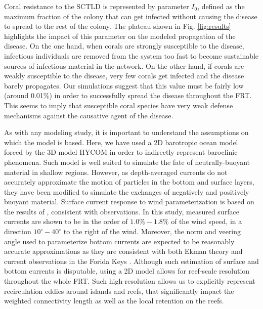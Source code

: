 \documentclass[utf8]{frontiersSCNS}
\begin{document}
Coral resistance to the SCTLD is represented by parameter $I_0$, defined as the maximum fraction of the colony that can get infected without causing the disease to spread to the rest of the colony. The plateau shown in Fig. \ref{fig:results} highlights the impact of this parameter on the modeled propagation of the disease. On the one hand, when corals are strongly susceptible to the disease, infectious individuals are removed from the system too fast to become sustainable sources of infectious material in the network. On the other hand, if corals are weakly susceptible to the disease, very few corals get infected and the disease barely propagates. Our simulations suggest that this value must be fairly low (around 0.01\%) in order to successfully spread the disease throughout the FRT. This seems to imply that susceptible coral species have very weak defense mechanisms against the causative agent of the disease.

As with any modeling study, it is important to understand the assumptions on which the model is based. Here, we have used a 2D barotropic ocean model forced by the 3D model HYCOM \citep{Chassignet2007} in order to indirectly represent baroclinic phenomena. Such model is well suited to simulate the fate of neutrally-buoyant material in shallow regions. However, as depth-averaged currents do not accurately approximate the motion of particles in the bottom and surface layers, they have been modified to simulate the exchanges of negatively and positively buoyant material. Surface current response to wind parameterization is based on the results of \cite{ardhuin2009observation}, consistent with observations. In this study, measured surface currents are shown to be in the order of $1.0\% - 1.8\%$ of the wind speed, in a direction $10^\circ - 40^\circ$ to the right of the wind. Moreover, the norm and veering angle used to parameterize bottom currents are expected to be reasonably accurate approximations as they are consistent with both Ekman theory and current observations in the Forida Keys \citep{perlin2007organization, kundu1976ekman, smith2009influence}. Although such estimation of surface and bottom currents is disputable, using a 2D model allows for reef-scale resolution throughout the whole FRT. Such high-resolution allows us to explicitly represent recirculation eddies around islands and reefs, that significantly impact the weighted connectivity length as well as the local retention on the reefs.
\end{document}
